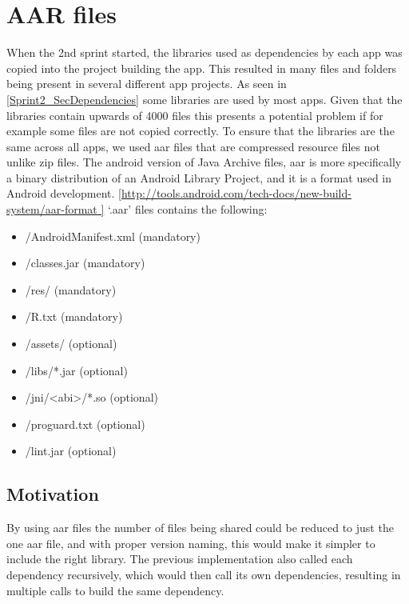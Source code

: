 \section{AAR files}\label{Sprint2_aarfiles}

When the 2nd sprint started, the libraries used as dependencies by each app was copied into the project building the app. This resulted in many files and folders being present in several different app projects. As seen in \ref{Sprint2_SecDependencies} some libraries are used by most apps. Given that the libraries contain upwards of 4000 files this presents a potential problem if for example some files are not copied correctly. To ensure that the libraries are the same across all apps, we used aar files that are compressed resource files not unlike zip files.
The android version of Java Archive files, aar is more specifically a binary distribution of an Android Library Project, and it is a format used in Android development. \ref{http://tools.android.com/tech-docs/new-build-system/aar-format }
‘.aar’ files contains the following:

\begin{itemize}
\item /AndroidManifest.xml (mandatory)
\item /classes.jar (mandatory)
\item /res/ (mandatory)
\item /R.txt (mandatory)
\item /assets/ (optional)
\item /libs/*.jar (optional)
\item /jni/<abi>/*.so (optional)
\item /proguard.txt (optional)
\item /lint.jar (optional)
\end{itemize}

\subsection{Motivation}
By using aar files the number of files being shared could be reduced to just the one aar file, and with proper version naming, this would make it simpler to include the right library. The previous implementation also called each dependency recursively, which would then call its own dependencies, resulting in multiple calls to build the same dependency.

